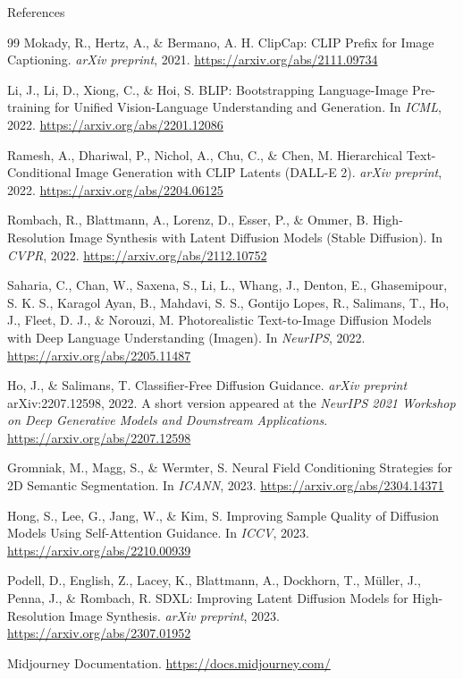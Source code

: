 \begin{frame}[allowframebreaks]{References}
\begin{thebibliography}{99}
Mokady, R., Hertz, A., \& Bermano, A. H.
\newblock ClipCap: CLIP Prefix for Image Captioning.
\newblock \emph{arXiv preprint}, 2021.
\newblock \url{https://arxiv.org/abs/2111.09734}

Li, J., Li, D., Xiong, C., \& Hoi, S.
\newblock BLIP: Bootstrapping Language-Image Pre-training for Unified Vision-Language Understanding and Generation.
\newblock In \emph{ICML}, 2022.
\newblock \url{https://arxiv.org/abs/2201.12086}

Ramesh, A., Dhariwal, P., Nichol, A., Chu, C., \& Chen, M.
\newblock Hierarchical Text-Conditional Image Generation with CLIP Latents (DALL-E 2).
\newblock \emph{arXiv preprint}, 2022.
\newblock \url{https://arxiv.org/abs/2204.06125}

Rombach, R., Blattmann, A., Lorenz, D., Esser, P., \& Ommer, B.
\newblock High-Resolution Image Synthesis with Latent Diffusion Models (Stable Diffusion).
\newblock In \emph{CVPR}, 2022.
\newblock \url{https://arxiv.org/abs/2112.10752}

Saharia, C., Chan, W., Saxena, S., Li, L., Whang, J., Denton, E., Ghasemipour, S. K. S., Karagol Ayan, B., Mahdavi, S. S., Gontijo Lopes, R., Salimans, T., Ho, J., Fleet, D. J., \& Norouzi, M.
\newblock Photorealistic Text-to-Image Diffusion Models with Deep Language Understanding (Imagen).
\newblock In \emph{NeurIPS}, 2022.
\newblock \url{https://arxiv.org/abs/2205.11487}

Ho, J., \& Salimans, T.
\newblock Classifier-Free Diffusion Guidance.
\newblock \emph{arXiv preprint} arXiv:2207.12598, 2022. A short version appeared at the \emph{NeurIPS 2021 Workshop on Deep Generative Models and Downstream Applications}.
\newblock \url{https://arxiv.org/abs/2207.12598}

Gromniak, M., Magg, S., \& Wermter, S.
\newblock Neural Field Conditioning Strategies for 2D Semantic Segmentation.
\newblock In \emph{ICANN}, 2023.
\newblock \url{https://arxiv.org/abs/2304.14371}

Hong, S., Lee, G., Jang, W., \& Kim, S.
\newblock Improving Sample Quality of Diffusion Models Using Self-Attention Guidance.
\newblock In \emph{ICCV}, 2023.
\newblock \url{https://arxiv.org/abs/2210.00939}

Podell, D., English, Z., Lacey, K., Blattmann, A., Dockhorn, T., M\"uller, J., Penna, J., \& Rombach, R.
\newblock SDXL: Improving Latent Diffusion Models for High-Resolution Image Synthesis.
\newblock \emph{arXiv preprint}, 2023.
\newblock \url{https://arxiv.org/abs/2307.01952}

Midjourney Documentation.
\newblock \url{https://docs.midjourney.com/}

\end{thebibliography}
\end{frame}
